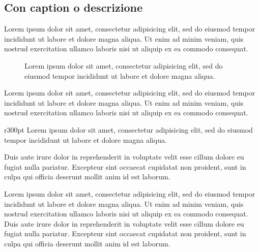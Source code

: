 \documentclass[a4paper, 12pt]{report}
\begin{document}
\subsection*{Con caption o descrizione}

Lorem ipsum dolor sit amet, consectetur adipisicing elit, sed do eiusmod
tempor incididunt ut labore et dolore magna aliqua. Ut enim ad minim veniam,
quis nostrud exercitation ullamco laboris nisi ut aliquip ex ea commodo consequat.

\begin{figure}[h]
	\centering
	\caption{
		Lorem ipsum dolor sit amet, consectetur adipisicing elit, sed do eiusmod
		tempor incididunt ut labore et dolore magna aliqua.
	}
\end{figure}

Lorem ipsum dolor sit amet, consectetur adipisicing elit, sed do eiusmod
tempor incididunt ut labore et dolore magna aliqua. Ut enim ad minim veniam,
quis nostrud exercitation ullamco laboris nisi ut aliquip ex ea commodo consequat.

\begin{wrapfigure}{r}{300pt}
	\centering
	\vspace{-1.5\baselineskip}
	{\footnotesize
		Lorem ipsum dolor sit amet, consectetur adipisicing elit, sed do eiusmod
		tempor incididunt ut labore et dolore magna aliqua.
	}
	\vspace{-1\baselineskip}
\end{wrapfigure}

Duis aute irure dolor in reprehenderit in voluptate velit esse
cillum dolore eu fugiat nulla pariatur. Excepteur sint occaecat cupidatat non
proident, sunt in culpa qui officia deserunt mollit anim id est laborum.

Lorem ipsum dolor sit amet, consectetur adipisicing elit, sed do eiusmod
tempor incididunt ut labore et dolore magna aliqua. Ut enim ad minim veniam,
quis nostrud exercitation ullamco laboris nisi ut aliquip ex ea commodo
consequat. Duis aute irure dolor in reprehenderit in voluptate velit esse
cillum dolore eu fugiat nulla pariatur. Excepteur sint occaecat cupidatat non
proident, sunt in culpa qui officia deserunt mollit anim id est laborum.
\end{document}
